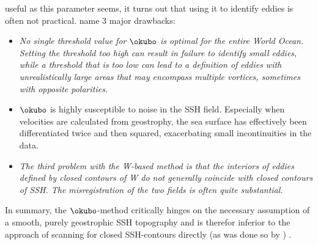 \begin{itemize}
	  useful as this parameter seems, it turns out that using it to identify eddies is often not practical.
	 name 3 major drawbacks:
	\begin{itemize}
		\item
		\textit{ No single threshold value for $\okubo$ is optimal for the entire World Ocean. Setting the threshold too high can result in failure to identify small eddies, while a threshold that is too low can lead to a definition of eddies with unrealistically large areas that may encompass multiple vortices, sometimes with opposite polarities. }
		\item
		$\okubo$ is highly susceptible to noise in the SSH field. Especially when velocities are calculated from geostrophy, the sea surface has effectively
		been differentiated twice and then squared, exacerbating small incontinuities in the data.
		\item
		\textit{The third problem with the W-based method is that the interiors of eddies defined by closed contours of W do not generally coincide with closed contours of SSH. The misregistration of the two fields is often quite substantial. }
	\end{itemize}
	In summary, the $\okubo$-method critically hinges on the necessary assumption of a smooth, purely geostrophic SSH topography and is therefor inferior to the approach of scanning for closed SSH-contours directly (as was done so by \citeauthor{Chelton2011}) \citet{Zhang2013}.




\end{itemize}
